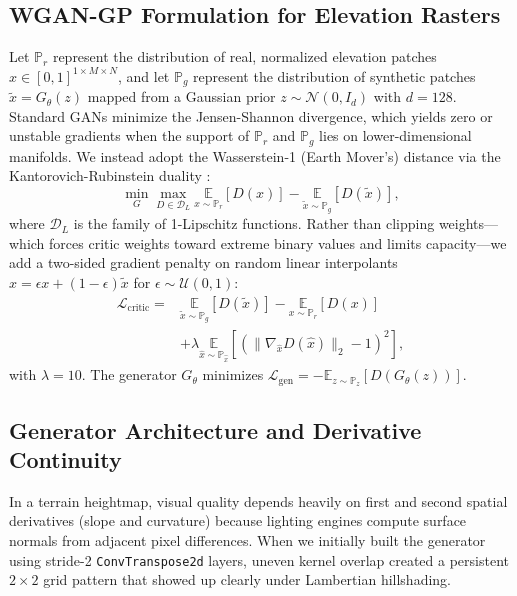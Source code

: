 \documentclass[conference]{IEEEtran}
\begin{document}
\subsection{WGAN-GP Formulation for Elevation Rasters}
Let $\mathbb{P}_r$ represent the distribution of real, normalized elevation patches $x \in [0, 1]^{1 \times M \times N}$, and let $\mathbb{P}_g$ represent the distribution of synthetic patches $\tilde{x} = G_\theta(z)$ mapped from a Gaussian prior $z \sim \mathcal{N}(0, I_d)$ with $d = 128$. Standard GANs minimize the Jensen-Shannon divergence, which yields zero or unstable gradients when the support of $\mathbb{P}_r$ and $\mathbb{P}_g$ lies on lower-dimensional manifolds. We instead adopt the Wasserstein-1 (Earth Mover's) distance via the Kantorovich-Rubinstein duality \cite{b14}:
\begin{equation}
\min_G \max_{D \in \mathcal{D}_L} \underset{x \sim \mathbb{P}_r}{\mathbb{E}}[D(x)] - \underset{\tilde{x} \sim \mathbb{P}_g}{\mathbb{E}}[D(\tilde{x})], \label{eq:wasserstein}
\end{equation}
where $\mathcal{D}_L$ is the family of 1-Lipschitz functions. Rather than clipping weights—which forces critic weights toward extreme binary values and limits capacity—we add a two-sided gradient penalty on random linear interpolants $\hat{x} = \epsilon x + (1 - \epsilon)\tilde{x}$ for $\epsilon \sim \mathcal{U}(0, 1)$:
\begin{equation}
\begin{split}
\mathcal{L}_{\text{critic}} = {} & \underset{\tilde{x} \sim \mathbb{P}_g}{\mathbb{E}}[D(\tilde{x})] - \underset{x \sim \mathbb{P}_r}{\mathbb{E}}[D(x)] \\
& + \lambda \underset{\hat{x} \sim \mathbb{P}_{\hat{x}}}{\mathbb{E}}\left[ \left( \|\nabla_{\hat{x}} D(\hat{x})\|_2 - 1 \right)^2 \right], \label{eq:critic_loss}
\end{split}
\end{equation}
with $\lambda = 10$. The generator $G_\theta$ minimizes $\mathcal{L}_{\text{gen}} = -\mathbb{E}_{z \sim \mathbb{P}_z}[D(G_\theta(z))]$.

\subsection{Generator Architecture and Derivative Continuity}
In a terrain heightmap, visual quality depends heavily on first and second spatial derivatives (slope and curvature) because lighting engines compute surface normals from adjacent pixel differences. When we initially built the generator using stride-2 \texttt{ConvTranspose2d} layers, uneven kernel overlap created a persistent $2\times 2$ grid pattern that showed up clearly under Lambertian hillshading.
\end{document}

